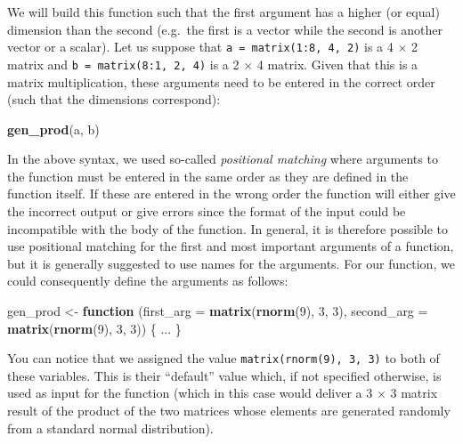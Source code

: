 \documentclass[12pt,]{krantz}
\newenvironment{Shaded}{\begin{snugshade}}{\end{snugshade}}
\newcommand{\KeywordTok}[1]{\textcolor[rgb]{0.27,0.27,0.27}{\textbf{#1}}}
\newcommand{\DataTypeTok}[1]{\textcolor[rgb]{0.27,0.27,0.27}{#1}}
\newcommand{\DecValTok}[1]{\textcolor[rgb]{0.06,0.06,0.06}{#1}}
\newcommand{\StringTok}[1]{\textcolor[rgb]{0.5,0.5,0.5}{#1}}
\newcommand{\ControlFlowTok}[1]{\textcolor[rgb]{0.27,0.27,0.27}{\textbf{#1}}}
\newcommand{\NormalTok}[1]{#1}
\begin{document}
We will build this function such that the first argument has a higher
(or equal) dimension than the second (e.g.~the first is a vector while
the second is another vector or a scalar). Let us suppose that
\texttt{a\ =\ matrix(1:8,\ 4,\ 2)} is a 4 \(\times\) 2 matrix and
\texttt{b\ =\ matrix(8:1,\ 2,\ 4)} is a 2 \(\times\) 4 matrix. Given
that this is a matrix multiplication, these arguments need to be entered
in the correct order (such that the dimensions correspond):

\begin{Shaded}
\begin{Highlighting}[]
\KeywordTok{gen_prod}\NormalTok{(a, b)}
\end{Highlighting}
\end{Shaded}

In the above syntax, we used so-called \emph{positional matching} where
arguments to the function must be entered in the same order as they are
defined in the function itself. If these are entered in the wrong order
the function will either give the incorrect output or give errors since
the format of the input could be incompatible with the body of the
function. In general, it is therefore possible to use positional
matching for the first and most important arguments of a function, but
it is generally suggested to use names for the arguments. For our
function, we could consequently define the arguments as follows:

\begin{Shaded}
\begin{Highlighting}[]
\NormalTok{gen_prod <-}\StringTok{ }\ControlFlowTok{function}\NormalTok{ (}\DataTypeTok{first_arg =} \KeywordTok{matrix}\NormalTok{(}\KeywordTok{rnorm}\NormalTok{(}\DecValTok{9}\NormalTok{), }\DecValTok{3}\NormalTok{, }\DecValTok{3}\NormalTok{), }
                      \DataTypeTok{second_arg =} \KeywordTok{matrix}\NormalTok{(}\KeywordTok{rnorm}\NormalTok{(}\DecValTok{9}\NormalTok{), }\DecValTok{3}\NormalTok{, }\DecValTok{3}\NormalTok{)) \{}
\NormalTok{  ...}
\NormalTok{\}}
\end{Highlighting}
\end{Shaded}

You can notice that we assigned the value
\texttt{matrix(rnorm(9),\ 3,\ 3)} to both of these variables. This is
their ``default'' value which, if not specified otherwise, is used as
input for the function (which in this case would deliver a 3 \(\times\)
3 matrix result of the product of the two matrices whose elements are
generated randomly from a standard normal distribution).
\end{document}
